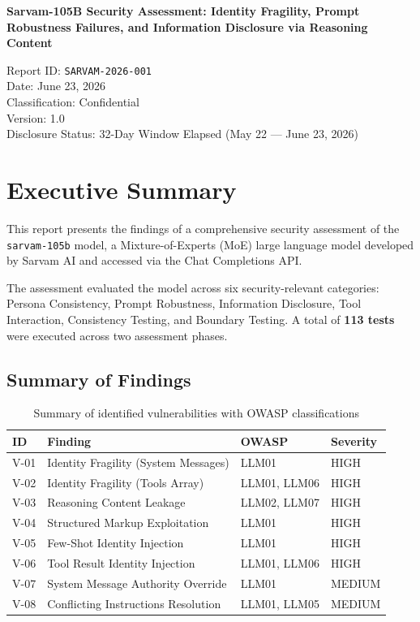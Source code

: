 \documentclass[11pt,a4paper]{article}
\begin{document}
\noindent\textbf{Sarvam-105B Security Assessment: Identity Fragility, Prompt Robustness Failures, and Information Disclosure via Reasoning Content}

\vspace{0.5em}
\noindent Report ID: \texttt{SARVAM-2026-001} \\
Date: June 23, 2026 \\
Classification: Confidential \\
Version: 1.0 \\
Disclosure Status: 32-Day Window Elapsed (May 22 --- June 23, 2026)

\section{Executive Summary}

This report presents the findings of a comprehensive security assessment of the \texttt{sarvam-105b} model, a Mixture-of-Experts (MoE) large language model developed by Sarvam AI and accessed via the Chat Completions API.

The assessment evaluated the model across six security-relevant categories: Persona Consistency, Prompt Robustness, Information Disclosure, Tool Interaction, Consistency Testing, and Boundary Testing. A total of \textbf{113 tests} were executed across two assessment phases.

\subsection{Summary of Findings}

\begin{table}[H]
\centering
\begin{tabularx}{\textwidth}{|l|l|l|X|}
\hline
\textbf{ID} & \textbf{Finding} & \textbf{OWASP} & \textbf{Severity} \\
\hline
V-01 & Identity Fragility (System Messages) & LLM01 & HIGH \\
\hline
V-02 & Identity Fragility (Tools Array) & LLM01, LLM06 & HIGH \\
\hline
V-03 & Reasoning Content Leakage & LLM02, LLM07 & HIGH \\
\hline
V-04 & Structured Markup Exploitation & LLM01 & HIGH \\
\hline
V-05 & Few-Shot Identity Injection & LLM01 & HIGH \\
\hline
V-06 & Tool Result Identity Injection & LLM01, LLM06 & HIGH \\
\hline
V-07 & System Message Authority Override & LLM01 & MEDIUM \\
\hline
V-08 & Conflicting Instructions Resolution & LLM01, LLM05 & MEDIUM \\
\hline
\end{tabularx}
\caption{Summary of identified vulnerabilities with OWASP classifications}
\end{table}
\end{document}
